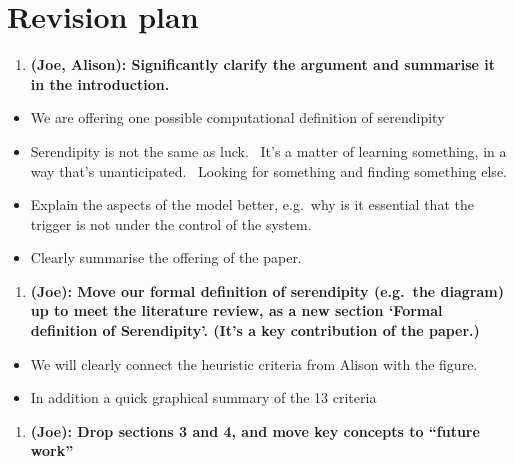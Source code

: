 \section{Revision plan}\label{plan-of-action}

\begin{enumerate}
\def\labelenumi{\arabic{enumi}.}
\itemsep1pt\parskip0pt
\item
  \textbf{(Joe, Alison): Significantly clarify the argument and
  summarise it in the introduction.}
\end{enumerate}

\begin{itemize}
\itemsep1pt\parskip0pt
\item
  We are offering one possible computational definition of serendipity
\item
  Serendipity is not the same as luck. ~It's a matter of learning
  something, in a way that's unanticipated. ~Looking for something and
  finding something else.
\item
  Explain the aspects of the model better, e.g.~why is it essential that
  the trigger is not under the control of the system.
\item
  Clearly summarise the offering of the paper.
\end{itemize}

\begin{enumerate}
\def\labelenumi{\arabic{enumi}.}
\setcounter{enumi}{1}
\itemsep1pt\parskip0pt
\item
  \textbf{(Joe): Move our formal definition of serendipity (e.g.~the
  diagram) up to meet the literature review, as a new section `Formal
  definition of Serendipity'. (It's a key contribution of the paper.)}
\end{enumerate}

\begin{itemize}
\itemsep1pt\parskip0pt
\item
  We will clearly connect the heuristic criteria from Alison with the
  figure.
\item
  In addition a quick graphical summary of the 13 criteria
\end{itemize}

\begin{enumerate}
\def\labelenumi{\arabic{enumi}.}
\setcounter{enumi}{2}
\itemsep1pt\parskip0pt
\item
  \textbf{(Joe): Drop sections 3 and 4, and move key concepts to
  ``future work''}
\end{enumerate}

